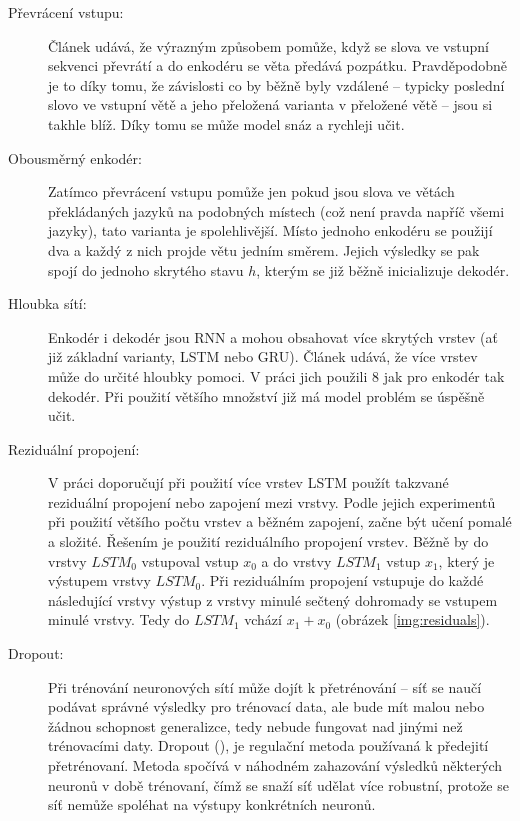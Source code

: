 \begin{description}
  \item[Převrácení vstupu:] \label{desc:revert} Článek \cite{seq2seq} udává, že výrazným způsobem pomůže, když se slova ve vstupní sekvenci převrátí a do enkodéru  se věta předává pozpátku. Pravděpodobně je to díky tomu, že závislosti co by běžně byly vzdálené -- typicky poslední slovo ve vstupní větě a jeho přeložená varianta v přeložené větě -- jsou si takhle blíž. Díky tomu se může model snáz a rychleji učit.
  \item[Obousměrný enkodér:] \label{desc:biriectional} Zatímco převrácení vstupu pomůže jen pokud jsou slova ve větách překládaných jazyků na podobných místech (což není pravda napříč všemi jazyky), tato varianta je spolehlivější. Místo jednoho enkodéru se použijí dva a každý z nich projde větu jedním směrem. Jejich výsledky se pak spojí do jednoho skrytého stavu $h$, kterým se již běžně inicializuje dekodér.
  \item[Hloubka sítí:] Enkodér i dekodér jsou RNN a mohou obsahovat více skrytých vrstev (ať již základní varianty, LSTM nebo GRU). Článek \cite{googleBridgingGap} udává, že více vrstev může do určité hloubky pomoci. V práci jich použili 8 jak pro enkodér tak dekodér. Při použití většího množství již má model problém se úspěšně učit.
  \item[Reziduální propojení:] \label{residuals} V práci \cite{googleBridgingGap} doporučují při použití více vrstev LSTM použít takzvané reziduální propojení nebo zapojení mezi vrstvy. Podle jejich experimentů při použití většího počtu vrstev a běžném zapojení, začne být učení pomalé a složité. Řešením je použití reziduálního propojení vrstev. Běžně by do vrstvy $LSTM_0$ vstupoval vstup $x_0$ a do vrstvy $LSTM_1$ vstup $x_1$, který je výstupem vrstvy $LSTM_0$. Při reziduálním propojení vstupuje do každé následující vrstvy výstup z vrstvy minulé sečtený dohromady se vstupem minulé vrstvy. Tedy do $LSTM_1$ vchází $x_1+x_0$ (obrázek \ref{img:residuals}).
  \item[Dropout:] \label{desc:dropout} Při trénování neuronových sítí může dojít k přetrénování -- síť se naučí podávat správné výsledky pro trénovací data, ale bude mít malou nebo žádnou schopnost generalizce, tedy nebude fungovat nad jinými než trénovacími daty. Dropout (\cite{dropout}), je regulační metoda používaná k předejití přetrénovaní. Metoda spočívá v náhodném zahazování výsledků některých neuronů v době trénovaní, čímž se snaží síť udělat více robustní, protože se síť nemůže spoléhat na výstupy konkrétních neuronů.

\end{description}


